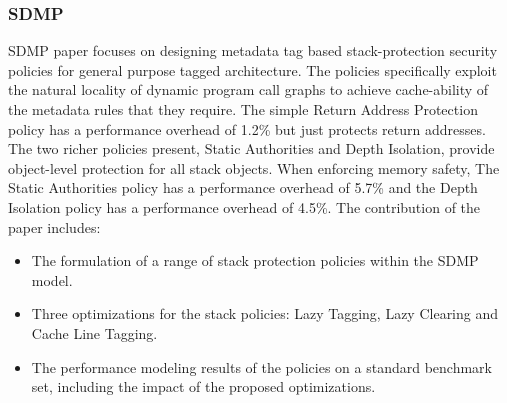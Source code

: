 \subsubsection{SDMP}
SDMP\cite{Sdmp} paper focuses on designing metadata tag based stack-protection security policies for general purpose tagged
architecture. The policies specifically
exploit the natural locality of dynamic program call graphs to
achieve cache-ability of the metadata rules that they require.
The simple Return Address Protection policy has a performance
overhead of 1.2\% but just protects return addresses.
The two richer policies present, Static Authorities and Depth Isolation, 
provide object-level protection for all stack objects. When
enforcing memory safety, The Static Authorities policy has a
performance overhead of 5.7\% and the Depth Isolation policy
has a performance overhead of 4.5\%.
The contribution of the paper includes:
\begin{itemize}
  \item The formulation of a range of stack protection policies
within the SDMP model.
  \item Three optimizations for the stack policies: Lazy Tagging,
Lazy Clearing and Cache Line Tagging.
  \item The performance modeling results of the policies on
a standard benchmark set, including the impact of the
proposed optimizations.
\end{itemize}

